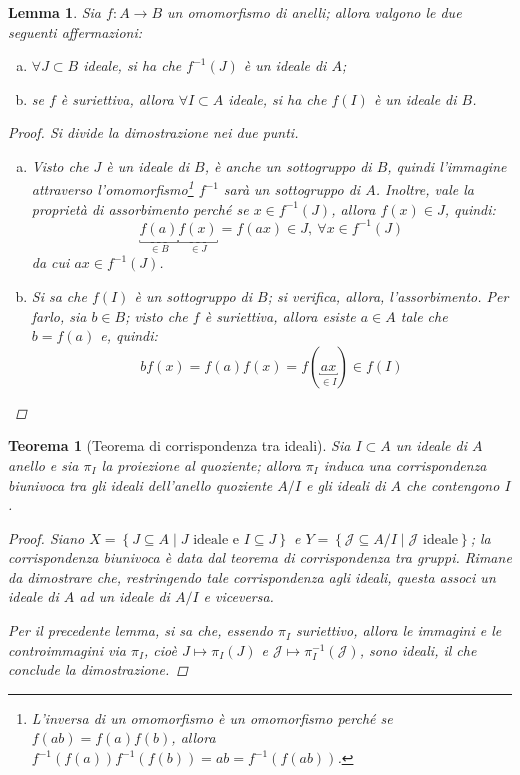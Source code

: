 \documentclass[12pt]{scrartcl}
\theoremstyle{style}
\newtheorem{teorema}{Teorema}[section]
\newtheorem{lemma}{Lemma}[teorema]
\numberwithin{equation}{subsection}
\begin{document}
\begin{lemma}
	Sia $f: A\to B$ un omomorfismo di anelli; allora valgono le due seguenti affermazioni:
\begin{enumerate}[(a).]
	\item $\forall J \subset B$ ideale, si ha che $f^{-1}(J)$ \`e un ideale di $A$;
	\item se $f$ \`e suriettiva, allora $\forall I \subset A$ ideale, si ha che $f(I)$ \`e un ideale di $B$.
\end{enumerate}
		\begin{proof}
			Si divide la dimostrazione nei due punti.
			\begin{enumerate}[(a).]
				\item Visto che $J$ \`e un ideale di $B$, \`e anche un sottogruppo di $B$, quindi l'immagine attraverso l'omomorfismo\footnote{L'inversa di un omomorfismo \`e un omomorfismo perch\'e se $f(ab) = f(a)f(b)$, allora $f^{-1}(f(a)) f^{-1}(f(b)) =ab= f^{-1}(f(ab))$.} $f^{-1}$ sar\`a un sottogruppo di $A$.
					Inoltre, vale la propriet\`a di assorbimento perch\'e se $x \in f^{-1}(J)$, allora $f(x) \in J$, quindi:
					\[
						\underbracket{f(a)}_{\in B} \underbracket{f(x)}_{\in J}  = f(ax) \in J, \ \forall x \in f^{-1}(J)
					\] 
					da cui $ax \in f^{-1}(J)$.
				\item Si sa che $f(I)$ \`e un sottogruppo di $B$; si verifica, allora, l'assorbimento. 
					Per farlo, sia $b \in B$; visto che $f$ \`e suriettiva, allora esiste $a \in A $ tale che $b = f(a)$ e, quindi:
					\[
						b f(x) = f(a) f(x) = f(\underbracket{ax}_{\in I} ) \in f(I)
					\] 
			\end{enumerate}
		\end{proof}
\end{lemma}
\begin{teorema}
	[Teorema di corrispondenza tra ideali]
	Sia $I \subset A$ un ideale di $A$ anello e sia $\pi_I$ la proiezione al quoziente; allora $\pi_I$ induca una corrispondenza biunivoca tra gli ideali dell'anello quoziente $A / I$ e gli ideali di $A$ che contengono $I$.
	\begin{proof}
		Siano $X = \left\{ J \subseteq A  \mid J \text{ ideale e } I \subseteq J\right\} $ e $Y = \left\{ \mathcal{J} \subseteq A / I  \mid \mathcal{J} \text{ ideale} \right\} $; la corrispondenza biunivoca \`e data dal teorema di corrispondenza tra gruppi. 
		Rimane da dimostrare che, restringendo tale corrispondenza agli ideali, questa associ un ideale di $A$ ad un ideale di $A / I$ e viceversa.

		Per il precedente lemma, si sa che, essendo $\pi_I$ suriettivo, allora le immagini e le controimmagini via $\pi_I$, cio\`e $J \longmapsto \pi_I (J)$ e $ \mathcal{J} \longmapsto \pi^{-1}_I(\mathcal{J} )$, sono ideali, il che conclude la dimostrazione.
	\end{proof}
\end{teorema}
\end{document}
